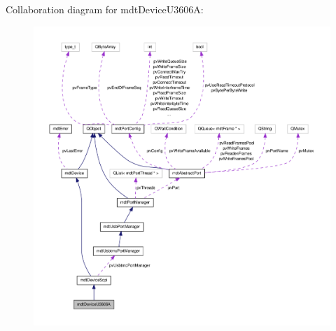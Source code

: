 Collaboration diagram for mdt\-Device\-U3606\-A\-:\nopagebreak
\begin{figure}[H]
\begin{center}
\leavevmode
\includegraphics[width=350pt]{classmdt_device_u3606_a__coll__graph}
\end{center}
\end{figure}
